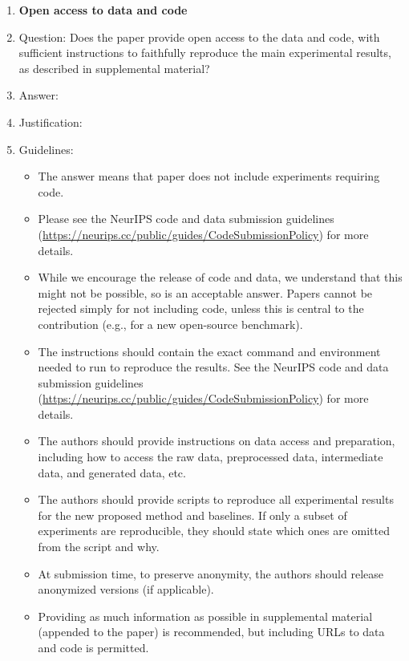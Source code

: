 \documentclass{article}
\begin{document}
\begin{enumerate}
\item {\bf Open access to data and code}
    \item[] Question: Does the paper provide open access to the data and code, with sufficient instructions to faithfully reproduce the main experimental results, as described in supplemental material?
    \item[] Answer: \answerTODO{} %
    \item[] Justification: \justificationTODO{}
    \item[] Guidelines:
    \begin{itemize}
        \item The answer \answerNA{} means that paper does not include experiments requiring code.
        \item Please see the NeurIPS code and data submission guidelines (\url{https://neurips.cc/public/guides/CodeSubmissionPolicy}) for more details.
        \item While we encourage the release of code and data, we understand that this might not be possible, so \answerNo{} is an acceptable answer. Papers cannot be rejected simply for not including code, unless this is central to the contribution (e.g., for a new open-source benchmark).
        \item The instructions should contain the exact command and environment needed to run to reproduce the results. See the NeurIPS code and data submission guidelines (\url{https://neurips.cc/public/guides/CodeSubmissionPolicy}) for more details.
        \item The authors should provide instructions on data access and preparation, including how to access the raw data, preprocessed data, intermediate data, and generated data, etc.
        \item The authors should provide scripts to reproduce all experimental results for the new proposed method and baselines. If only a subset of experiments are reproducible, they should state which ones are omitted from the script and why.
        \item At submission time, to preserve anonymity, the authors should release anonymized versions (if applicable).
        \item Providing as much information as possible in supplemental material (appended to the paper) is recommended, but including URLs to data and code is permitted.
    \end{itemize}



\end{enumerate}
\end{document}
